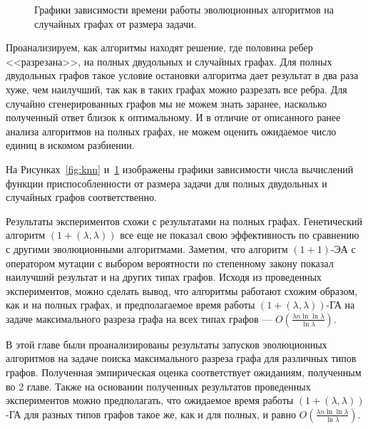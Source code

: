 \documentclass[times]{itmo-student-thesis}
\newcommand{\alglambda}{${(1 + (\lambda , \lambda))}$\xspace}
\newcommand{\alglambdaf}{${(1 + (\lambda , \lambda))}$-ГА\xspace}
\newcommand{\oea}{\mbox{$(1 + 1)$-ЭА}\xspace}
\begin{document}
\begin{figure}[t!]
\caption{Графики зависимости времени работы эволюционных алгоритмов на случайных графах от размера задачи.}
\label{fig:rand}
\end{figure}

Проанализируем, как алгоритмы находят решение, где половина ребер <<разрезана>>, на полных двудольных и случайных графах.
Для полных двудольных графов такое условие остановки алгоритма дает результат в два раза хуже, чем наилучший, так как в таких графах можно разрезать все ребра.
Для случайно сгенерированных графов мы не можем знать заранее, насколько полученный ответ близок к оптимальному.
И в отличие от описанного ранее анализа алгоритмов на полных графах, не можем оценить ожидаемое число единиц в искомом разбиении.

На Рисунках~\ref{fig:knn} и~\ref{fig:rand} изображены графики зависимости числа вычислений функции приспособленности от размера задачи для полных двудольных и случайных графов соответственно.

Результаты экспериментов схожи с результатами на полных графах. Генетический алгоритм \alglambda все еще не показал свою эффективность по сравнению с другими эволюционными алгоритмами.
Заметим, что алгоритм \oea с оператором мутации с выбором вероятности по степенному закону показал наилучший результат и на других типах графов.
Исходя из проведенных экспериментов, можно сделать вывод, что алгоритмы работают схожим образом, как и на полных графах, и предполагаемое время работы \alglambdaf на задаче максимального разреза графа на всех типах графов --- $O\left(\frac{\lambda n\ln \ln \lambda}{\ln \lambda}\right)$.



\chapterconclusion
В этой главе были проанализированы результаты запусков эволюционных алгоритмов на задаче поиска максимального разреза графа для различных типов графов. Полученная эмпирическая оценка соответствует ожиданиям, полученным во 2 главе.
Также на основании полученных результатов проведенных экспериментов можно предполагать, что ожидаемое время работы \alglambdaf для разных типов графов такое же, как и для полных, и равно $O\left(\frac{\lambda n\ln \ln \lambda}{\ln \lambda}\right)$.
\end{document}
